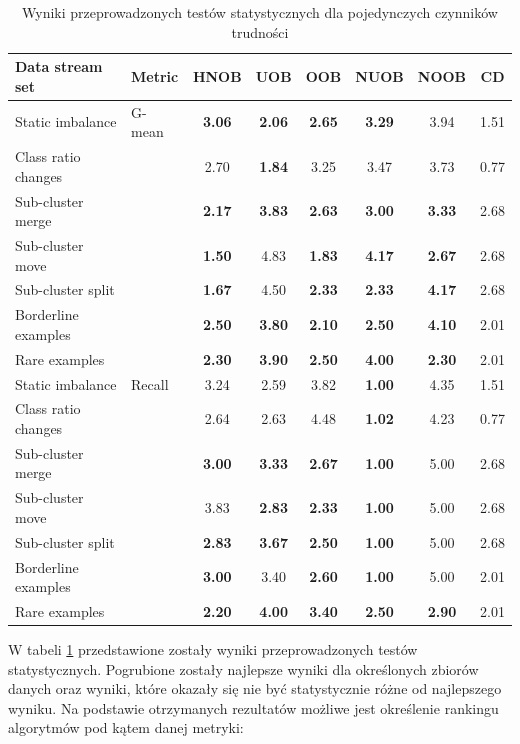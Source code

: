 \begin{table}[ht]
\centering\small%
\setlength{\tabcolsep}{10pt} 
\renewcommand{\arraystretch}{1.5} 
\begin{tabular}{l l c c c c c c}
\toprule
Data stream set & Metric & HNOB & UOB & OOB & NUOB & NOOB & CD \\
\midrule
Static imbalance & G-mean & \textbf{3.06} & \textbf{2.06} & \textbf{2.65} & \textbf{3.29} & 3.94 & 1.51 \\
Class ratio changes & & 2.70 & \textbf{1.84} & 3.25 & 3.47 & 3.73 & 0.77 \\
Sub-cluster merge & & \textbf{2.17} & \textbf{3.83} & \textbf{2.63} & \textbf{3.00} & \textbf{3.33} & 2.68 \\
Sub-cluster move & & \textbf{1.50} & 4.83 & \textbf{1.83} & \textbf{4.17} & \textbf{2.67} & 2.68 \\
Sub-cluster split & & \textbf{1.67} & 4.50 & \textbf{2.33} & \textbf{2.33} & \textbf{4.17} & 2.68 \\
Borderline examples & & \textbf{2.50} & \textbf{3.80} & \textbf{2.10} & \textbf{2.50} & \textbf{4.10} & 2.01 \\
Rare examples & & \textbf{2.30} & \textbf{3.90} & \textbf{2.50} & \textbf{4.00} & \textbf{2.30} & 2.01 \\
Static imbalance & Recall & 3.24 & 2.59 & 3.82 & \textbf{1.00} & 4.35 & 1.51 \\
Class ratio changes & & 2.64 & 2.63 & 4.48 & \textbf{1.02} & 4.23 & 0.77 \\
Sub-cluster merge & & \textbf{3.00} & \textbf{3.33} & \textbf{2.67} & \textbf{1.00} & 5.00 & 2.68 \\
Sub-cluster move & & 3.83 & \textbf{2.83} & \textbf{2.33} & \textbf{1.00} & 5.00 & 2.68 \\
Sub-cluster split & & \textbf{2.83} & \textbf{3.67} & \textbf{2.50} & \textbf{1.00} & 5.00 & 2.68 \\
Borderline examples & & \textbf{3.00} & 3.40 & \textbf{2.60} & \textbf{1.00} & 5.00 & 2.01 \\
Rare examples & & \textbf{2.20} & \textbf{4.00} & \textbf{3.40} & \textbf{2.50} & \textbf{2.90} & 2.01 \\
\bottomrule
\end{tabular}
\caption{Wyniki przeprowadzonych testów statystycznych dla pojedynczych czynników trudności}\label{Tab:SingleDriftFriedmanHNOB}
\end{table}

\noindent W tabeli \ref{Tab:SingleDriftFriedmanHNOB} przedstawione zostały wyniki przeprowadzonych testów statystycznych. Pogrubione zostały najlepsze wyniki dla określonych zbiorów danych oraz wyniki, które okazały się nie być statystycznie różne od najlepszego wyniku. Na podstawie otrzymanych rezultatów możliwe jest określenie rankingu algorytmów pod kątem danej metryki:

